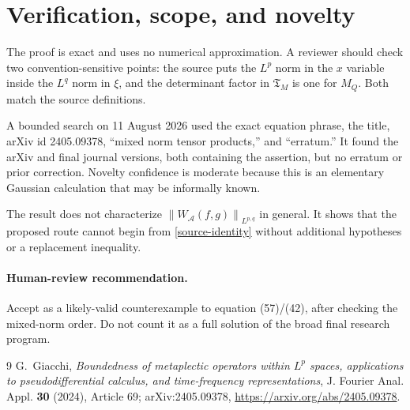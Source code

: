 \documentclass[11pt]{article}
\newcommand{\T}{\mathfrak T}
\newcommand{\norm}[1]{\left\lVert #1\right\rVert}
\begin{document}
\section{Verification, scope, and novelty}

The proof is exact and uses no numerical approximation.  A reviewer should
check two convention-sensitive points: the source puts the $L^p$ norm in the
$x$ variable inside the $L^q$ norm in $\xi$, and the determinant factor in
$\T_M$ is one for $M_Q$.  Both match the source definitions.

A bounded search on 11 August 2026 used the exact equation phrase, the title,
arXiv id 2405.09378, ``mixed norm tensor products,'' and ``erratum.''  It found
the arXiv and final journal versions, both containing the assertion, but no
erratum or prior correction.  Novelty confidence is moderate because this is
an elementary Gaussian calculation that may be informally known.

The result does not characterize $\norm{W_{\mathcal A}(f,g)}_{L^{p,q}}$ in
general.  It shows that the proposed route cannot begin from
\eqref{source-identity} without additional hypotheses or a replacement
inequality.

\paragraph{Human-review recommendation.}
Accept as a likely-valid counterexample to equation (57)/(42), after checking
the mixed-norm order.  Do not count it as a full solution of the broad final
research program.

\begin{thebibliography}{9}
G.~Giacchi,
\emph{Boundedness of metaplectic operators within $L^p$ spaces, applications
to pseudodifferential calculus, and time-frequency representations},
J. Fourier Anal. Appl. \textbf{30} (2024), Article 69;
arXiv:2405.09378, \url{https://arxiv.org/abs/2405.09378}.
\end{thebibliography}
\end{document}
